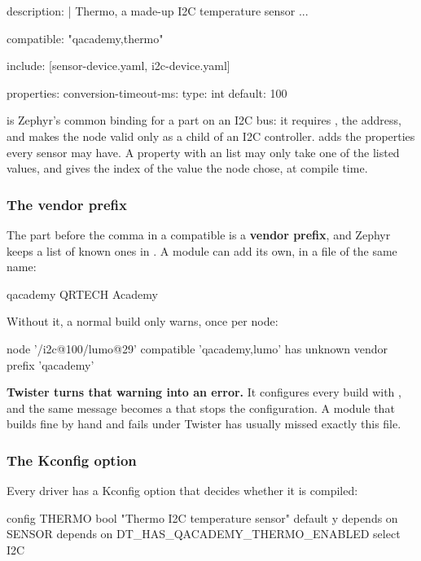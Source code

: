 \begin{yamlcode}
description: |
  Thermo, a made-up I2C temperature sensor ...

compatible: "qacademy,thermo"

include: [sensor-device.yaml, i2c-device.yaml]

properties:
  conversion-timeout-ms:
    type: int
    default: 100
\end{yamlcode}

\noindent {} is Zephyr’s common binding for a part on an I2C bus: it requires
, the address, and makes the node valid only as a child of an I2C controller.
 adds the properties every sensor may have. A property with an 
list may only take one of the listed values, and  gives the index
of the value the node chose, at compile time.

\subsubsection{The vendor prefix}
The part before the comma in a compatible is a \textbf{vendor prefix}, and Zephyr keeps a list of
known ones in . A module can add its own, in a file of the
same name:

\begin{console}
qacademy	QRTECH Academy
\end{console}

\noindent Without it, a normal build only warns, once per node:

\begin{console}
node '/i2c@100/lumo@29' compatible 'qacademy,lumo' has unknown vendor prefix 'qacademy'
\end{console}

\noindent \textbf{Twister turns that warning into an error.} It configures every build with
, and the same message becomes a 
that stops the configuration. A module that builds fine by hand and fails under Twister has usually
missed exactly this file.

\subsubsection{The Kconfig option}
Every driver has a Kconfig option that decides whether it is compiled:

\begin{kconfigcode}
config THERMO
	bool "Thermo I2C temperature sensor"
	default y
	depends on SENSOR
	depends on DT_HAS_QACADEMY_THERMO_ENABLED
	select I2C
\end{kconfigcode}

